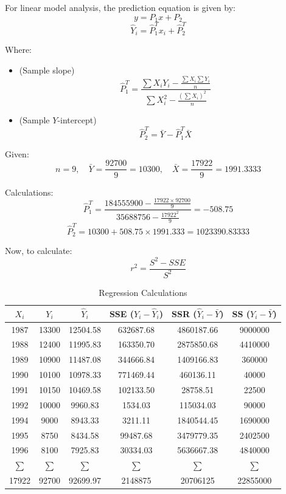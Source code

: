 \documentclass[12pt]{article}
\begin{document}
For linear model analysis, the prediction equation is given by:
\[
y = P_1 x + P_2
\]
\[
\hat{Y}_i = \hat{P}_1^T x_i + \hat{P}_2^T
\]

Where:
\begin{itemize}
    \item (Sample slope) 
    \[
    \hat{P}_1^T = \frac{\sum X_i Y_i - \frac{\sum X_i \sum Y_i}{n}}{\sum X_i^2 - \frac{(\sum X_i)^2}{n}}
    \]
    \item (Sample \( Y \)-intercept) 
    \[
    \hat{P}_2^T = \bar{Y} - \hat{P}_1^T \bar{X}
    \]
\end{itemize}

Given:
\[
n = 9, \quad \bar{Y} = \frac{92700}{9} = 10300, \quad \bar{X} = \frac{17922}{9} = 1991.3333
\]

Calculations:
\[
\hat{P}_1^T = \frac{184555900 - \frac{17922 \times 92700}{9}}{35688756 - \frac{17922^2}{9}} = -508.75
\]
\[
\hat{P}_2^T = 10300 + 508.75 \times 1991.333 = 1023390.83333
\]

Now, to calculate:
\[
r^2 = \frac{S^2 - SSE}{S^2}
\]

\begin{table}[h!]
    \centering
    \caption{Regression Calculations}
    \begin{tabular}{cccccc}
        \toprule
        \( X_i \) & \( Y_i \) & \( \hat{Y}_i \) & SSE (\( Y_i - \hat{Y}_i \)) & SSR (\( \hat{Y}_i - \bar{Y} \)) & SS (\( Y_i - \bar{Y} \)) \\
        \midrule
        1987 & 13300 & 12504.58 & 632687.68 & 4860187.66 & 9000000 \\
        1988 & 12400 & 11995.83 & 163350.70 & 2875850.68 & 4410000 \\
        1989 & 10900 & 11487.08 & 344666.84 & 1409166.83 & 360000 \\
        1990 & 10100 & 10978.33 & 771469.44 & 460136.11 & 40000 \\
        1991 & 10150 & 10469.58 & 102133.50 & 28758.51 & 22500 \\
        1992 & 10000 & 9960.83 & 1534.03 & 115034.03 & 90000 \\
        1994 & 9000 & 8943.33 & 3211.11 & 1840544.45 & 1690000 \\
        1995 & 8750 & 8434.58 & 99487.68 & 3479779.35 & 2402500 \\
        1996 & 8100 & 7925.83 & 30334.03 & 5636667.38 & 4840000 \\
        \midrule
        \(\sum\) & \(\sum\) & \(\sum\) & \(\sum\) & \(\sum\) & \(\sum\) \\
        17922 & 92700 & 92699.97 & 2148875 & 20706125 & 22855000 \\
        \bottomrule
    \end{tabular}
\end{table}
\end{document}
